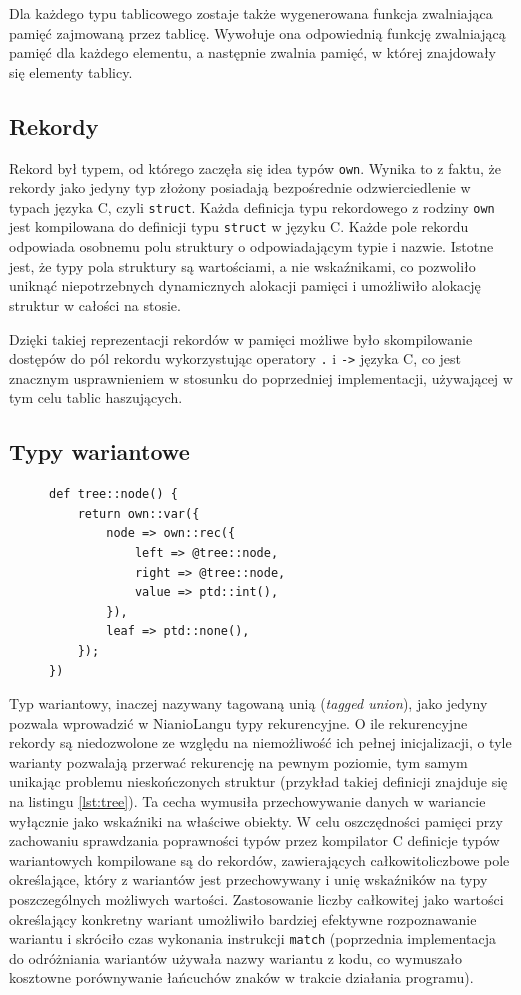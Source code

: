 \documentclass[licencjacka]{pracamgr}
\begin{document}
Dla każdego typu tablicowego zostaje także wygenerowana funkcja zwalniająca pamięć zajmowaną
przez tablicę. Wywołuje ona odpowiednią funkcję zwalniającą pamięć dla każdego elementu,
a następnie zwalnia pamięć, w której znajdowały się elementy tablicy.
\subsection{Rekordy}
Rekord był typem, od którego zaczęła się idea typów \texttt{own}. Wynika to z faktu, że rekordy jako jedyny
typ złożony posiadają bezpośrednie odzwierciedlenie w typach języka C, czyli \texttt{struct}.
Każda definicja typu rekordowego z rodziny \texttt{own} jest kompilowana do definicji typu \texttt{struct}
w języku C. Każde pole rekordu odpowiada osobnemu polu struktury o odpowiadającym typie i nazwie.
Istotne jest, że typy pola struktury są wartościami, a nie wskaźnikami, co pozwoliło uniknąć niepotrzebnych
dynamicznych alokacji pamięci i umożliwiło alokację struktur w całości na stosie.

Dzięki takiej reprezentacji rekordów w pamięci możliwe było skompilowanie dostępów do pól rekordu wykorzystując
operatory \texttt{.} i \texttt{->} języka C, co jest znacznym usprawnieniem w stosunku do poprzedniej implementacji,
używającej w tym celu tablic haszujących.
\subsection{Typy wariantowe}
\begin{figure}
\begin{lstlisting}[caption={Rekurencyjna definicja struktury drzewiastej},label={lst:tree},aboveskip=-15pt,language=nl]
def tree::node() {
    return own::var({
        node => own::rec({
            left => @tree::node,
            right => @tree::node,
            value => ptd::int(),
		}),
        leaf => ptd::none(),
	});
})
\end{lstlisting}
\end{figure}
Typ wariantowy, inaczej nazywany tagowaną unią (\textit{tagged union}), jako jedyny pozwala wprowadzić
w NianioLangu typy rekurencyjne. O ile rekurencyjne rekordy są niedozwolone ze względu na niemożliwość ich
pełnej inicjalizacji, o tyle warianty pozwalają przerwać rekurencję na pewnym poziomie, tym samym unikając
problemu nieskończonych struktur (przykład takiej definicji znajduje się na listingu \ref{lst:tree}).
Ta cecha wymusiła przechowywanie danych w wariancie wyłącznie jako wskaźniki na właściwe obiekty.
W celu oszczędności pamięci przy zachowaniu sprawdzania poprawności typów przez kompilator C definicje typów
wariantowych kompilowane są do rekordów, zawierających całkowitoliczbowe pole określające, który z wariantów
jest przechowywany i unię wskaźników na typy poszczególnych możliwych wartości.
Zastosowanie liczby całkowitej jako wartości określający konkretny wariant umożliwiło bardziej efektywne
rozpoznawanie wariantu i skróciło czas wykonania instrukcji \texttt{match} (poprzednia implementacja do
odróżniania wariantów używała nazwy wariantu z kodu, co wymuszało kosztowne porównywanie łańcuchów znaków
w trakcie działania programu).
\end{document}
